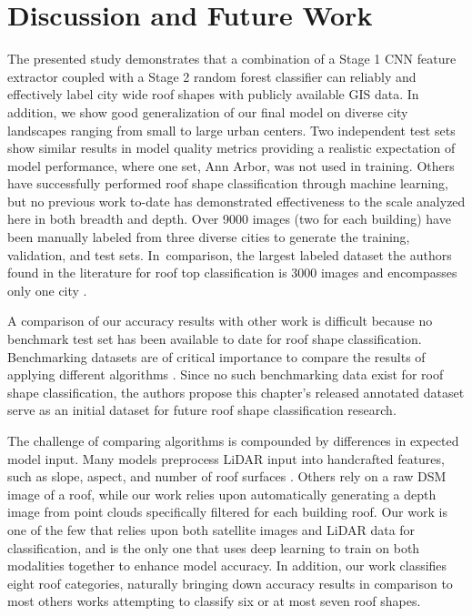 \section{Discussion and Future Work}

The presented study demonstrates that a combination of a Stage    1 \ac{CNN} feature extractor coupled with a Stage    2 random forest classifier can reliably and effectively label city wide roof shapes with publicly available GIS data. In addition, we show good generalization of our final model on diverse city landscapes ranging from small to large urban centers.  Two independent test sets show similar results in model quality metrics providing a realistic expectation of model performance, where one set, Ann Arbor, was not used in training.  Others have successfully performed roof shape classification through machine learning, but no previous work to-date has demonstrated effectiveness to the scale analyzed here in both breadth and depth. Over 9000 images (two for each building) have been manually labeled from three diverse cities to generate the training, validation, and test sets. In~comparison, the largest labeled dataset the authors found in the literature for roof top classification is 3000 images and encompasses only one city \cite{partovi_roof_2017}.

{A comparison of our accuracy results with other work is difficult  because no benchmark test set has been available to date for roof shape classification. Benchmarking datasets are of critical importance to compare the results of applying different algorithms  \cite{rottensteiner_results_2014}. %
Since no such benchmarking data exist  for roof shape classification, the authors propose this chapter's released annotated dataset serve as an initial dataset for future roof shape classification research.}

The challenge of comparing algorithms is compounded by differences in expected model input. Many models preprocess LiDAR input into handcrafted features, such as slope, aspect, and number of roof surfaces \cite{assouline_building_2017, mohajeri_city-scale_2018}. Others rely on a raw DSM image of a roof, while our work relies upon automatically generating a depth image from point clouds specifically filtered for each building roof.  Our work is one of the few that relies upon both satellite images and LiDAR data for classification, and is the only one that uses deep learning to train on both modalities together to enhance model accuracy. In addition, our work classifies eight roof categories, naturally bringing down accuracy results in comparison to most others works attempting to classify six or at most seven roof shapes. 

